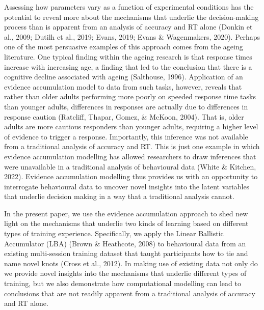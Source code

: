 \documentclass[
  man, donotrepeattitle,floatsintext]{apa6}
\begin{document}
Assessing how parameters vary as a function of experimental conditions has the potential to reveal more about the mechanisms that underlie the decision-making process than is apparent from an analysis of accuracy and RT alone (Donkin et al., 2009; Dutilh et al., 2019; Evans, 2019; Evans \& Wagenmakers, 2020). Perhaps one of the most persuasive examples of this approach comes from the ageing literature. One typical finding within the ageing research is that response times increase with increasing age, a finding that led to the conclusion that there is a cognitive decline associated with ageing (Salthouse, 1996). Application of an evidence accumulation model to data from such tasks, however, reveals that rather than older adults performing more poorly on speeded response time tasks than younger adults, differences in responses are actually due to differences in response caution (Ratcliff, Thapar, Gomez, \& McKoon, 2004). That is, older adults are more cautious responders than younger adults, requiring a higher level of evidence to trigger a response. Importantly, this inference was not available from a traditional analysis of accuracy and RT. This is just one example in which evidence accumulation modelling has allowed researchers to draw inferences that were unavailable in a traditional analysis of behavioural data (White \& Kitchen, 2022). Evidence accumulation modelling thus provides us with an opportunity to interrogate behavioural data to uncover novel insights into the latent variables that underlie decision making in a way that a traditional analysis cannot.

In the present paper, we use the evidence accumulation approach to shed new light on the mechanisms that underlie two kinds of learning based on different types of training experience. Specifically, we apply the Linear Ballistic Accumulator (LBA) (Brown \& Heathcote, 2008) to behavioural data from an existing multi-session training dataset that taught participants how to tie and name novel knots (Cross et al., 2012). In making use of existing data not only do we provide novel insights into the mechanisms that underlie different types of training, but we also demonstrate how computational modelling can lead to conclusions that are not readily apparent from a traditional analysis of accuracy and RT alone.
\end{document}
